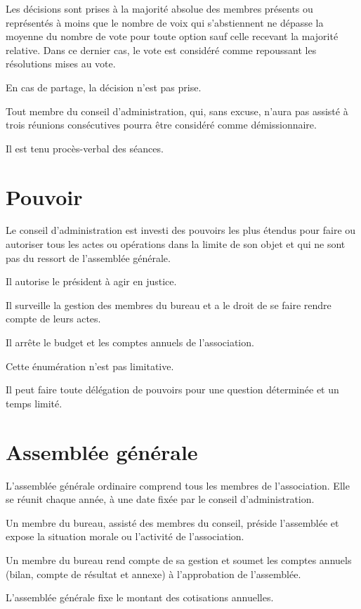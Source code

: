 \documentclass[12 pt]{article}
\begin{document}
Les décisions sont prises à la majorité absolue des membres présents
ou représentés à moins que le nombre de voix qui s'abstiennent ne dépasse
la moyenne du nombre de vote pour toute option sauf celle recevant la
majorité relative.  Dans ce dernier cas, le vote est considéré comme
repoussant les résolutions mises au vote.

En cas de partage, la décision n'est pas prise.

Tout membre du conseil d'administration, qui, sans excuse, n'aura pas
assisté à trois réunions consécutives pourra être considéré comme
démissionnaire.

Il est tenu procès-verbal des séances.

\section{Pouvoir}
\label{sec:pouvoir}

Le conseil d'administration est investi des pouvoirs les plus étendus
pour faire ou autoriser tous les actes ou opérations dans la limite de
son objet et qui ne sont pas du ressort de l'assemblée générale.

Il autorise le président à agir en justice.

Il surveille la gestion des membres du bureau et a le droit de se
faire rendre compte de leurs actes.

Il arrête le budget et les comptes annuels de l'association.

Cette énumération n'est pas limitative.

Il peut faire toute délégation de pouvoirs pour une question
déterminée et un temps limité.

\section{Assemblée générale}
\label{sec:assemblee-generale}


L’assemblée générale ordinaire comprend tous les membres de
l’association. Elle se réunit chaque année, à une date fixée par le
conseil d’administration.

Un membre du bureau, assisté des
membres du conseil, préside l’assemblée et expose la situation morale
ou l’activité de l’association.

Un membre du bureau rend compte de
sa gestion et soumet les comptes annuels (bilan, compte de résultat et
annexe) à l’approbation de l’assemblée.

L’assemblée générale fixe le montant des cotisations annuelles.
\end{document}
